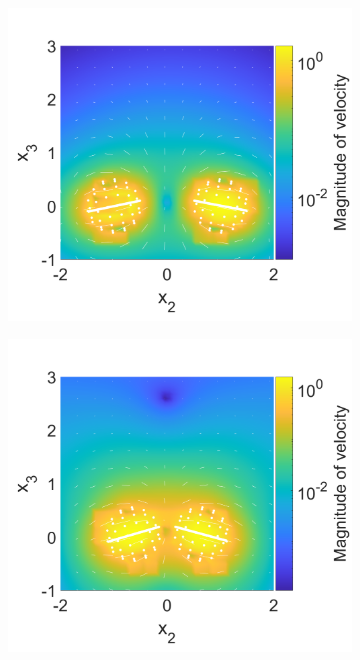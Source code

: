 \begin{figure}
\centering
\begin{subfigure}[b]{0.328\textwidth}
    \centering
    \includegraphics[width=\textwidth]{Images/squirmers/Pair-1.pdf}
    \caption[]{\label{fig:PairA}}
\end{subfigure}
\begin{subfigure}[b]{0.328\textwidth}
    \centering
    \includegraphics[width=\textwidth]{Images/squirmers/Pair-2.pdf}

\end{subfigure}
\end{figure}
